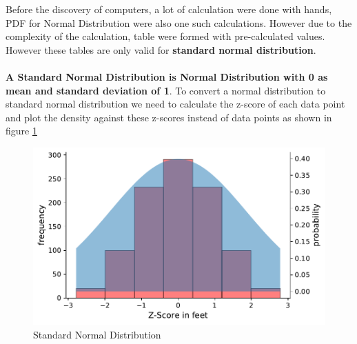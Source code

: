 \documentclass[twoside,12pt]{report}  %
\begin{document}
Before the discovery of computers, a lot of calculation were done with hands, PDF for Normal Distribution were also one such calculations. However due to the complexity of the calculation, table were formed with pre-calculated values. However these tables are only valid for \textbf{standard normal distribution}.
\\
\\
\textbf{A Standard Normal Distribution is Normal Distribution with 0 as mean and standard deviation of 1}. To convert a normal distribution to standard normal distribution we need to calculate the z-score of each data point and plot the density against these z-scores instead of data points as shown in figure \ref{figure_normal_example_z}
\begin{figure}[H]
	\centering
	\includegraphics[width=0.5\linewidth]{./images/normal_example_z.pdf}
	\caption{Standard Normal Distribution}
	\label{figure_normal_example_z}
\end{figure}
\end{document}

